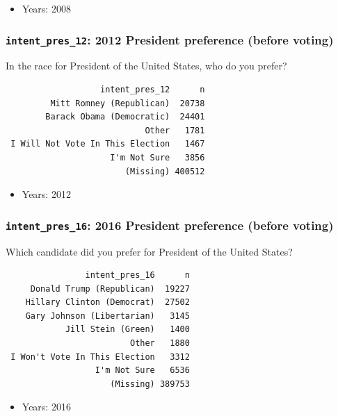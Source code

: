 \documentclass[10pt,article,oneside]{memoir}
\theoremstyle{definition}
\begin{document}
\begin{itemize}
\tightlist
\item
  Years: 2008
\end{itemize}

\subsubsection{\texorpdfstring{\texttt{intent\_pres\_12}: 2012 President
preference (before
voting)}{intent\_pres\_12: 2012 President preference (before voting)}}\label{intent_pres_12-2012-president-preference-before-voting}

In the race for President of the United States, who do you prefer?

\begin{verbatim}
                   intent_pres_12      n
         Mitt Romney (Republican)  20738
        Barack Obama (Democratic)  24401
                            Other   1781
 I Will Not Vote In This Election   1467
                     I'm Not Sure   3856
                        (Missing) 400512
\end{verbatim}

\begin{itemize}
\tightlist
\item
  Years: 2012
\end{itemize}

\subsubsection{\texorpdfstring{\texttt{intent\_pres\_16}: 2016 President
preference (before
voting)}{intent\_pres\_16: 2016 President preference (before voting)}}\label{intent_pres_16-2016-president-preference-before-voting}

Which candidate did you prefer for President of the United States?

\begin{verbatim}
                intent_pres_16      n
     Donald Trump (Republican)  19227
    Hillary Clinton (Democrat)  27502
    Gary Johnson (Libertarian)   3145
            Jill Stein (Green)   1400
                         Other   1880
 I Won't Vote In This Election   3312
                  I'm Not Sure   6536
                     (Missing) 389753
\end{verbatim}

\begin{itemize}
\tightlist
\item
  Years: 2016
\end{itemize}
\end{document}
